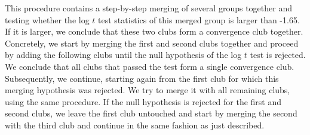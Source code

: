 \documentclass[11pt]{article}
\begin{document}
This procedure contains a step-by-step merging of several groups together and testing whether the log $t$ test statistics of this merged group is larger than -1.65. If it is larger, we conclude that these two clubs form a convergence club together. Concretely, we start by merging the first and second clubs together and proceed by adding the following clubs until the null hypothesis of the log $t$ test is rejected. We conclude that all clubs that passed the test form a single convergence club. Subsequently, we continue, starting again from the first club for which this merging hypothesis was rejected. We try to merge it with all remaining clubs, using the same procedure. If the null hypothesis is rejected for the first and second clubs, we leave the first club untouched and start by merging the second with the third club and continue in the same fashion as just described.
\end{document}
